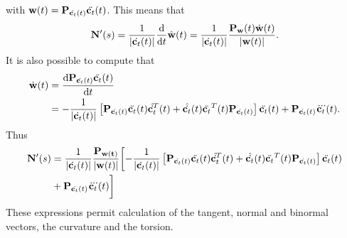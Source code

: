with $\vct{w}(t) = \mtx{P}_{\dx(t)}\ddx(t)$. This means that 
\begin{equation}
\vct{N}'(\parm) = \frac{1}{\lvert\dx(t)\rvert}\frac{\d{}}{\d{t}}\hat{\vct{w}}(t)=\frac{1}{\lvert\dx(t)\rvert}\frac{\mtx{P}_\vct{w}(t)\dot{\vct{w}}(t)}{\lvert\vct{w}(t)\rvert}.
\end{equation}
It is also possible to compute that
\begin{equation}
\begin{split}
\dw(t) &= \frac{\d{\mtx{P}_{\dx(t)}\ddx(t)}}{\d{t}}\\ 
&= -\frac{1}{\lvert\dx(t)\rvert}\left[\Pdx\ddx(t)\udx^T(t) + \udx(t)\ddx^T(t)\Pdx\right]\ddx(t) + \mtx{P}_{\dx(t)}\dddx(t).
\end{split}
\end{equation}
Thus
\begin{equation}
\begin{split}
\vct{N}'(\parm) &= \frac{1}{\lvert\dx(t)\rvert}\frac{\mtx{P}_\vct{w(t)}}{\lvert\vct{w}(t)\rvert}\biggl[-\frac{1}{\lvert\dx(t)\rvert}\left[\Pdx\ddx(t)\udx^T(t) + \udx(t)\ddx^T(t)\Pdx\right]\ddx(t)\\ 
&+ \mtx{P}_{\dx(t)}\dddx(t)\biggr]
\end{split}
\end{equation}
These expressions permit calculation of the tangent, normal and binormal vectors, the curvature and the torsion. 
